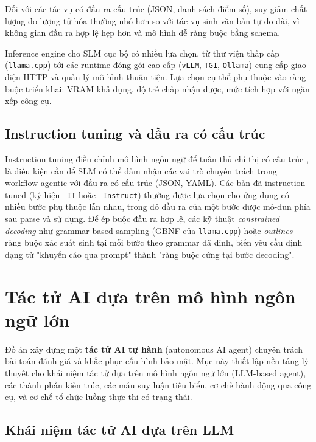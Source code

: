 Đối với các tác vụ có đầu ra cấu trúc (JSON, danh sách điểm số), suy giảm chất lượng do lượng tử hóa thường nhỏ hơn so với tác vụ sinh văn bản tự do dài, vì không gian đầu ra hợp lệ hẹp hơn và mô hình dễ ràng buộc bằng schema.

Inference engine cho SLM cục bộ có nhiều lựa chọn, từ thư viện thấp cấp (\texttt{llama.cpp}) tới các runtime đóng gói cao cấp (\texttt{vLLM}, \texttt{TGI}, \texttt{Ollama}) cung cấp giao diện HTTP và quản lý mô hình thuận tiện. Lựa chọn cụ thể phụ thuộc vào ràng buộc triển khai: VRAM khả dụng, độ trễ chấp nhận được, mức tích hợp với ngăn xếp công cụ.

\subsection{Instruction tuning và đầu ra có cấu trúc}
\label{subsec:instruction-tuning}

Instruction tuning điều chỉnh mô hình ngôn ngữ để tuân thủ chỉ thị có cấu trúc \cite{ouyang2022instructgpt}, là điều kiện cần để SLM có thể đảm nhận các vai trò chuyên trách trong workflow agentic với đầu ra có cấu trúc (JSON, YAML). Các bản đã instruction-tuned (ký hiệu \texttt{-IT} hoặc \texttt{-Instruct}) thường được lựa chọn cho ứng dụng có nhiều bước phụ thuộc lẫn nhau, trong đó đầu ra của một bước được mô-đun phía sau parse và sử dụng. Để ép buộc đầu ra hợp lệ, các kỹ thuật \textit{constrained decoding} như grammar-based sampling (GBNF của \texttt{llama.cpp}) hoặc \textit{outlines} \cite{willard_outlines_2023} ràng buộc xác suất sinh tại mỗi bước theo grammar đã định, biến yêu cầu định dạng từ "khuyến cáo qua prompt" thành "ràng buộc cứng tại bước decoding".

\section{Tác tử AI dựa trên mô hình ngôn ngữ lớn}
\label{sec:ai-agent}

Đồ án xây dựng một \textbf{tác tử AI tự hành} (autonomous AI agent) chuyên trách bài toán đánh giá và khắc phục cấu hình bảo mật. Mục này thiết lập nền tảng lý thuyết cho khái niệm tác tử dựa trên mô hình ngôn ngữ lớn (LLM-based agent), các thành phần kiến trúc, các mẫu suy luận tiêu biểu, cơ chế hành động qua công cụ, và cơ chế tổ chức luồng thực thi có trạng thái.

\subsection{Khái niệm tác tử AI dựa trên LLM}
\label{subsec:agent-concept}

